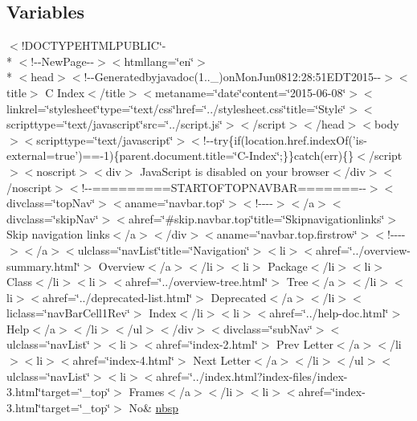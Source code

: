 \subsection*{Variables}
\begin{DoxyCompactItemize}
\item 
$<$!D\-O\-C\-T\-Y\-P\-E\-H\-T\-M\-L\-P\-U\-B\-L\-I\-C\char`\"{}-\/\\*
$<$!-\/-\/New\-Page-\/-\/$>$$<$htmllang=\char`\"{}en\char`\"{}$>$\\*
$<$head$>$$<$!-\/-\/Generatedbyjavadoc(1..\-\_)on\-Mon\-Jun0812\-:28\-:51\-E\-D\-T2015-\/-\/$>$$<$title$>$ C Index$<$/title$>$$<$metaname=\char`\"{}date\char`\"{}content=\char`\"{}2015-\/06-\/08\char`\"{}$>$$<$linkrel=\char`\"{}stylesheet\char`\"{}type=\char`\"{}text/css\char`\"{}href=\char`\"{}../stylesheet.\-css\char`\"{}title=\char`\"{}\-Style\char`\"{}$>$$<$scripttype=\char`\"{}text/javascript\char`\"{}src=\char`\"{}../script.\-js\char`\"{}$>$$<$/script$>$$<$/head$>$$<$body$>$$<$scripttype=\char`\"{}text/javascript\char`\"{}$>$$<$!-\/-\/try\{if(location.\-href.\-index\-Of('is-\/external=true')==-\/1)\{parent.\-document.\-title=\char`\"{}\-C-\/\-Index\char`\"{};\}\}catch(err)\{\}$<$/script$>$$<$noscript$>$$<$div$>$ Java\-Script is disabled on your browser$<$/div$>$$<$/noscript$>$$<$!-\/-\/=========\-S\-T\-A\-R\-T\-O\-F\-T\-O\-P\-N\-A\-V\-B\-A\-R=======-\/-\/$>$$<$divclass=\char`\"{}top\-Nav\char`\"{}$>$$<$aname=\char`\"{}navbar.\-top\char`\"{}$>$$<$!-\/-\/-\/-\/$>$$<$/a$>$$<$divclass=\char`\"{}skip\-Nav\char`\"{}$>$$<$ahref=\char`\"{}\#skip.\-navbar.\-top\char`\"{}title=\char`\"{}\-Skipnavigationlinks\char`\"{}$>$ Skip navigation links$<$/a$>$$<$/div$>$$<$aname=\char`\"{}navbar.\-top.\-firstrow\char`\"{}$>$$<$!-\/-\/-\/-\/$>$$<$/a$>$$<$ulclass=\char`\"{}nav\-List\char`\"{}title=\char`\"{}\-Navigation\char`\"{}$>$$<$li$>$$<$ahref=\char`\"{}../overview-\/summary.\-html\char`\"{}$>$ Overview$<$/a$>$$<$/li$>$$<$li$>$ Package$<$/li$>$$<$li$>$ Class$<$/li$>$$<$li$>$$<$ahref=\char`\"{}../overview-\/tree.\-html\char`\"{}$>$ Tree$<$/a$>$$<$/li$>$$<$li$>$$<$ahref=\char`\"{}../deprecated-\/list.\-html\char`\"{}$>$ Deprecated$<$/a$>$$<$/li$>$$<$liclass=\char`\"{}nav\-Bar\-Cell1\-Rev\char`\"{}$>$ Index$<$/li$>$$<$li$>$$<$ahref=\char`\"{}../help-\/doc.\-html\char`\"{}$>$ Help$<$/a$>$$<$/li$>$$<$/ul$>$$<$/div$>$$<$divclass=\char`\"{}sub\-Nav\char`\"{}$>$$<$ulclass=\char`\"{}nav\-List\char`\"{}$>$$<$li$>$$<$ahref=\char`\"{}index-\/2.\-html\char`\"{}$>$ Prev Letter$<$/a$>$$<$/li$>$$<$li$>$$<$ahref=\char`\"{}index-\/4.\-html\char`\"{}$>$ Next Letter$<$/a$>$$<$/li$>$$<$/ul$>$$<$ulclass=\char`\"{}nav\-List\char`\"{}$>$$<$li$>$$<$ahref=\char`\"{}../index.\-html?index-\/files/index-\/3.\-html\char`\"{}target=\char`\"{}\-\_\-top\char`\"{}$>$ Frames$<$/a$>$$<$/li$>$$<$li$>$$<$ahref=\char`\"{}index-\/3.\-html\char`\"{}target=\char`\"{}\-\_\-top\char`\"{}$>$ No\& \hyperlink{index-3_8html_a479d00f21dbca369efe3be97f1ef785a}{nbsp}
\end{DoxyCompactItemize}


